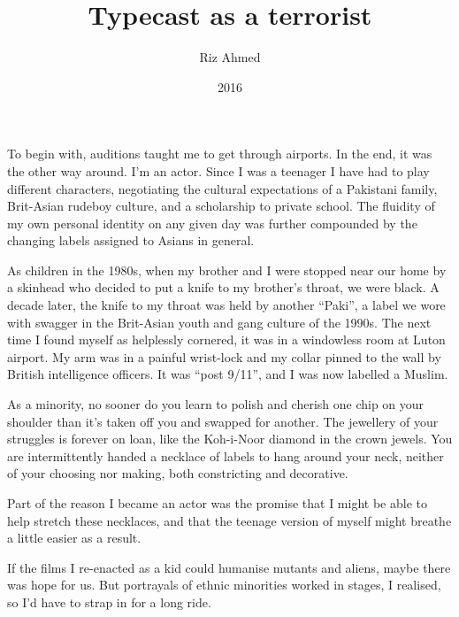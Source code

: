 \documentclass[10pt,a4paper]{article}
\begin{document}
\title{Typecast as a terrorist}
\date{2016}
\author{Riz Ahmed}

\maketitle
    
\noindent\linenumbers To begin with, auditions taught me to get through airports. In the end, it was the other way around. I’m an actor. Since I was a teenager I have had to play different characters, negotiating the cultural expectations of a Pakistani family, Brit-Asian rudeboy culture, and a scholarship to private school. The fluidity of my own personal identity on any given day was further compounded by the changing labels assigned to Asians in general.

As children in the 1980s, when my brother and I were stopped near our home by a skinhead who decided to put a knife to my brother’s throat, we were black. A decade later, the knife to my throat was held by another “Paki”, a label we wore with swagger in the Brit-Asian youth and gang culture of the 1990s. The next time I found myself as helplessly cornered, it was in a windowless room at Luton airport. My arm was in a painful wrist-lock and my collar pinned to the wall by British intelligence officers. It was “post 9/11”, and I was now labelled a Muslim.

As a minority, no sooner do you learn to polish and cherish one chip on your shoulder than it’s taken off you and swapped for another. The jewellery of your struggles is forever on loan, like the Koh-i-Noor diamond in the crown jewels. You are intermittently handed a necklace of labels to hang around your neck, neither of your choosing nor making, both constricting and decorative.

Part of the reason I became an actor was the promise that I might be able to help stretch these necklaces, and that the teenage version of myself might breathe a little easier as a result.

If the films I re-enacted as a kid could humanise mutants and aliens, maybe there was hope for us. But portrayals of ethnic minorities worked in stages, I realised, so I’d have to strap in for a long ride.
\end{document}
